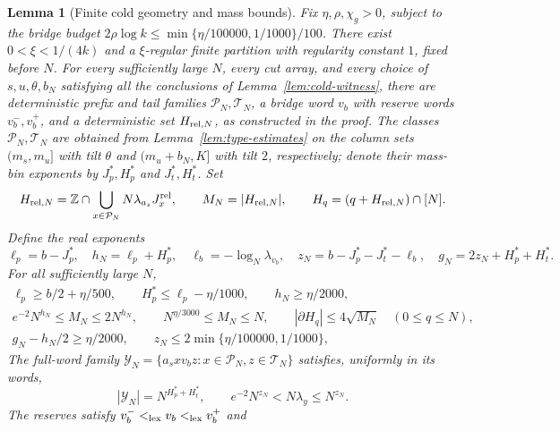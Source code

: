 \documentclass[11pt]{article}
\numberwithin{equation}{section}
\newtheorem{lemma}[theorem]{Lemma}
\theoremstyle{definition}
\theoremstyle{remark}
\newcommand{\1}{\mathbf 1}
\begin{document}
\begin{lemma}[Finite cold geometry and mass bounds]
\label{lem:cold-geometry}
Fix $\eta,\rho,\chi_g>0$, subject to the
bridge budget $2\rho\log k\le\min\{\eta/100000,1/1000\}/100$. There exist $0<\xi<1/(4k)$ and a $\xi$-regular finite partition with regularity constant $1$, fixed before $N$. For every sufficiently large $N$, every cut array, and every choice of $s,u,\theta,b_N$ satisfying all the conclusions of Lemma~\ref{lem:cold-witness}, there are deterministic prefix
and tail families $\mathcal P_N,\mathcal T_N$, a bridge word $v_b$ with
reserve words $v_b^-,v_b^+$, and a deterministic set $H_{{\rm rel},N}$,
as constructed in the proof. The classes $\mathcal P_N,\mathcal T_N$
are obtained from Lemma~\ref{lem:type-estimates} on the column sets
$(m_s,m_u]$ with tilt $\theta$ and $(m_u+b_N,K]$ with tilt $2$,
respectively; denote their mass-bin exponents by $J_p^*,H_p^*$ and
$J_t^*,H_t^*$. Set
\[
 H_{{\rm rel},N}=\mathbb Z\cap
    \bigcup_{x\in\mathcal P_N}N\lambda_{a_s}J_x^{\rm rel},\qquad
 M_N=|H_{{\rm rel},N}|,\qquad H_q=(q+H_{{\rm rel},N})\cap[N].
\]
Define the real exponents
\[
 \ell_p=b-J_p^*,\quad h_N=\ell_p+H_p^*,\quad
 \ell_b=-\log_N\lambda_{v_b},\quad
 z_N=b-J_p^*-J_t^*-\ell_b,\quad
 g_N=2z_N+H_p^*+H_t^*.
\]
For all sufficiently large $N$,
\begin{gather}
 \ell_p\ge b/2+\eta/500,\qquad H_p^*\le\ell_p-\eta/1000,\qquad
 h_N\ge\eta/2000,\label{eq:cold-effective-geometry}\\
 e^{-2}N^{h_N}\le M_N\le2N^{h_N},\qquad
 N^{\eta/3000}\le M_N\le N,\qquad
 |\partial H_q|\le4\sqrt{M_N}\quad(0\le q\le N),
 \label{eq:cold-geometric-conclusions}\\
 g_N-h_N/2\ge\eta/2000,\qquad z_N\le2\min\{\eta/100000,1/1000\},
 \label{eq:cold-effective-collision}
\end{gather}
The full-word family $\mathcal Y_N=\{a_sxv_bz:x\in\mathcal P_N,z\in\mathcal T_N\}$
satisfies, uniformly in its words,
\begin{equation}
\label{eq:cold-full-word-masses}
 |\mathcal Y_N|=N^{H_p^*+H_t^*},\qquad
 e^{-2}N^{z_N}<N\lambda_y\le N^{z_N}.
\end{equation}
The reserves satisfy $v_b^-<_{\rm lex}v_b<_{\rm lex}v_b^+$ and
\begin{equation}

\end{equation}
\end{lemma}
\end{document}
